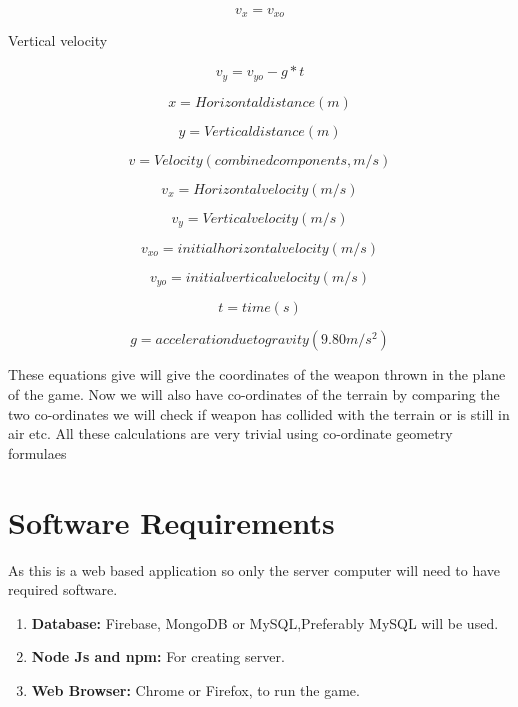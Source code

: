 \documentclass[12pt]{extarticle}
\begin{document}
$$v_{x} = v_{xo}$$

Vertical velocity

$$v_{y} = v_{yo} - g*t$$

$$x = Horizontal distance (m)$$

$$y = Vertical distance (m)$$

$$v = Velocity (combined components, m/s)$$

$$v_{x} = Horizontal velocity (m/s)$$

$$v_{y} = Vertical velocity (m/s)$$

$$v_{xo} = initial horizontal velocity (m/s)$$

$$v_{yo} = initial vertical velocity (m/s)$$

$$t = time (s)$$

$$g = acceleration due to gravity (9.80 m/s^{2})$$		
		
These equations give will give the coordinates of the weapon thrown in the plane of the game. Now we will also have co-ordinates of the terrain by comparing the two co-ordinates we will check if weapon has collided with the terrain or is still in air etc. All these calculations are very trivial using co-ordinate geometry formulaes		
\section{Software Requirements}		
As this is a web based application so only the server computer will need to have required software.
\begin{enumerate}
\item \textbf{Database:} Firebase, MongoDB  or MySQL,Preferably MySQL will be used.

\item \textbf{Node Js and npm:} For creating server.

\item \textbf{Web Browser:} Chrome or Firefox, to run the game.
 
\end{enumerate}		
		
		
\end{document}
